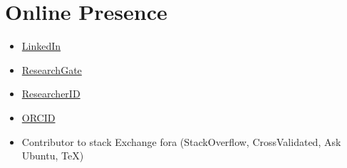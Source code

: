 \documentclass[a4paper,11pt,oneside]{article}
\begin{document}
\section*{Online Presence}
\begin{itemize}
  \item \href{https://www.linkedin.com/pub/frederiek-maarten-kerckhof/26/b47/668}{LinkedIn}
  \item \href{https://www.researchgate.net/profile/Frederiek-Maarten_Kerckhof}{ResearchGate}
  \item \href{http://www.researcherid.com/ProfileView.action?SID=V2bGbhtEe1TlsfIEXBz&returnCode=ROUTER.Success&queryString=KG0UuZjN5WlUD2sX8KoC12Tw17vPT2A6ocQ5tgzRDDI\%253D\&SrcApp=CR\&Init=Yes}{ResearcherID}
  \item \href{http://orcid.org/0000-0002-4472-6810}{ORCID}
  \item Contributor to stack Exchange fora (StackOverflow, CrossValidated, Ask Ubuntu, TeX)
\end{itemize}

\renewcommand{\refname}{Academic publications and conference proceedings} %
\renewcommand{\bibname}{Academic publications and conference proceedings} %
\nocite{*}


%
\end{document}

